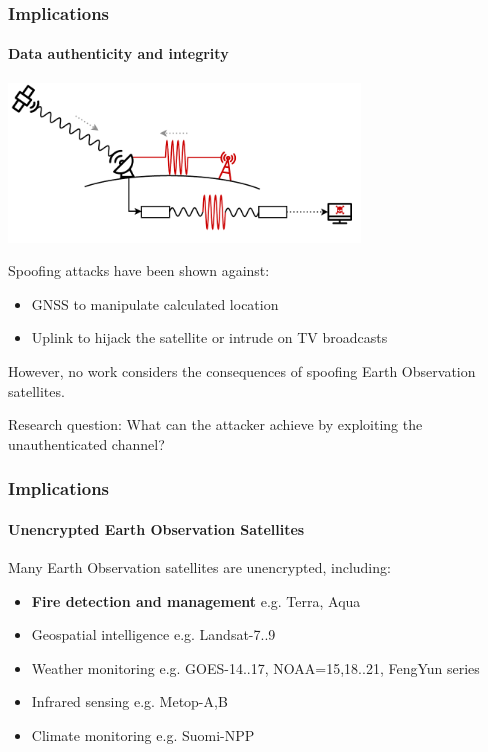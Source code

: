 \documentclass{beamer}
\begin{document}
\begin{frame}
  \frametitle{Implications}
  \framesubtitle{Data authenticity and integrity}

  \begin{center}
    \includegraphics[width=0.7\textwidth]{images/overshadow_illustration.pdf}
  \end{center}

  Spoofing attacks have been shown against:
  
  \begin{itemize}
    \item GNSS to manipulate calculated location~\cite{tippenhauer2011requirements,2204.11641}
    \item Uplink to hijack the satellite or intrude on TV broadcasts~\cite{time_midnight,2011ChinaCongressReport}
  \end{itemize}

  However, no work considers the consequences of spoofing Earth Observation satellites.

  Research question: What can the attacker achieve by exploiting the unauthenticated channel?
\end{frame}

\begin{frame}
  \frametitle{Implications}
  \framesubtitle{Unencrypted Earth Observation Satellites}

  Many Earth Observation satellites are unencrypted, including:

  \begin{itemize}
    \item \textbf{Fire detection and management} e.g. Terra, Aqua
    \item Geospatial intelligence e.g. Landsat-7..9
    \item Weather monitoring e.g. GOES-14..17, NOAA=15,18..21, FengYun series
    \item Infrared sensing e.g. Metop-A,B
    \item Climate monitoring e.g. Suomi-NPP
  \end{itemize}
\end{frame}
\end{document}
